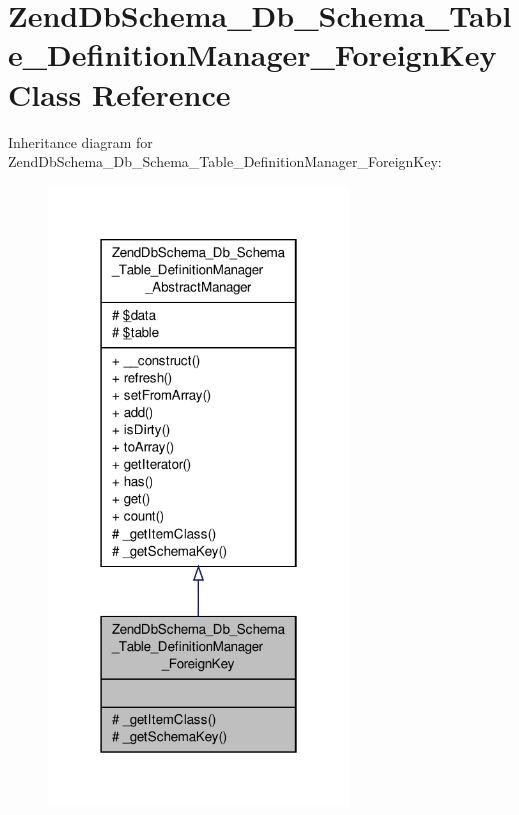 \hypertarget{classZendDbSchema__Db__Schema__Table__DefinitionManager__ForeignKey}{\section{Zend\-Db\-Schema\-\_\-\-Db\-\_\-\-Schema\-\_\-\-Table\-\_\-\-Definition\-Manager\-\_\-\-Foreign\-Key Class Reference}
\label{classZendDbSchema__Db__Schema__Table__DefinitionManager__ForeignKey}
}


Inheritance diagram for Zend\-Db\-Schema\-\_\-\-Db\-\_\-\-Schema\-\_\-\-Table\-\_\-\-Definition\-Manager\-\_\-\-Foreign\-Key\-:\nopagebreak
\begin{figure}[H]
\begin{center}
\leavevmode
\includegraphics[width=226pt]{classZendDbSchema__Db__Schema__Table__DefinitionManager__ForeignKey__inherit__graph}
\end{center}
\end{figure}


